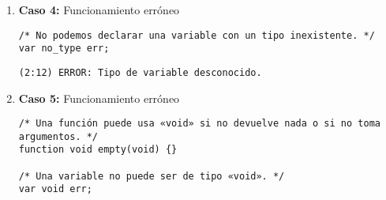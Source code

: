 \begin{enumerate}
\begin{tcolorbox}[title={Árbol sintáctico generado con la herramienta VASt}, colback=white, breakable]
\begin{lstlisting}
                                · id
                                · C (58)
                                  · lambda
                              · B1 (48)
                                · lambda
                          · A1 (43)
                            · lambda
                        · EXP1 (38)
                          · lambda
                      · ;
                  · P (2)
                    · STATEMENT (19)
                      · ATOMSTATEMENT (21)
                        · output
                        · EXP (36)
                          · A (41)
                            · B (46)
                              · EXPATOM (54)
                                · cstr
                              · B1 (48)
                                · lambda
                            · A1 (43)
                              · lambda
                          · EXP1 (38)
                            · lambda
                        · ;
                    · P (3)
                      · eof
        \end{lstlisting}
    \end{tcolorbox}

    
    \item \textbf{Caso 4:} Funcionamiento erróneo
    \begin{tcolorbox}[title={Código fuente}, colback=white]
        \begin{lstlisting}
/* No podemos declarar una variable con un tipo inexistente. */
var no_type err;
        \end{lstlisting}      
    \end{tcolorbox}

    \begin{tcolorbox}[title={Errores detectados}, colback=white]
        \begin{lstlisting}
(2:12) ERROR: Tipo de variable desconocido.
        \end{lstlisting}
    \end{tcolorbox}


    \item \textbf{Caso 5:} Funcionamiento erróneo
    \begin{tcolorbox}[title={Código fuente}, colback=white]
        \begin{lstlisting}
/* Una función puede usa «void» si no devuelve nada o si no toma argumentos. */
function void empty(void) {}

/* Una variable no puede ser de tipo «void». */
var void err;
        \end{lstlisting}      
    \end{tcolorbox}


\end{enumerate}
